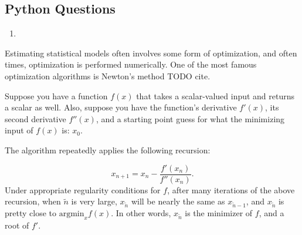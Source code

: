 \documentclass[
  12pt,
]{krantz}
\providecommand{\tightlist}{%
  \setlength{\itemsep}{0pt}\setlength{\parskip}{0pt}}
\begin{document}
\hypertarget{python-questions-4}{%
\subsection{Python Questions}\label{python-questions-4}}

\begin{enumerate}
\def\labelenumi{\arabic{enumi}.}
\tightlist
\item
\end{enumerate}

Estimating statistical models often involves some form of optimization, and often times, optimization is performed numerically. One of the most famous optimization algorithms is Newton's method TODO cite.

Suppose you have a function \(f(x)\) that takes a scalar-valued input and returns a scalar as well. Also, suppose you have the function's derivative \(f'(x)\), its second derivative \(f''(x)\), and a starting point guess for what the minimizing input of \(f(x)\) is: \(x_0\).

The algorithm repeatedly applies the following recursion:

\[
x_{n+1} = x_{n} - \frac{f'(x_n)}{f''(x_{n})}.
\]
Under appropriate regularity conditions for \(f\), after many iterations of the above recursion, when \(\tilde{n}\) is very large, \(x_{\tilde{n}}\) will be nearly the same as \(x_{\tilde{n}-1}\), and \(x_{\tilde{n}}\) is pretty close to \(\text{argmin}_x f(x)\). In other words, \(x_{\tilde{n}}\) is the minimizer of \(f\), and a root of \(f'\).
\end{document}
